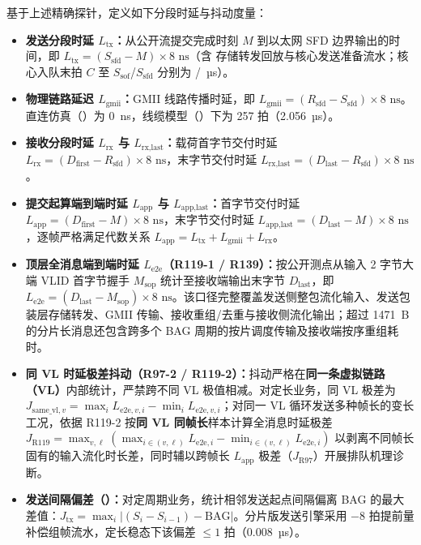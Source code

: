 基于上述精确探针，定义如下分段时延与抖动度量：
\begin{itemize}
  \item \textbf{发送分段时延 $L_\text{tx}$：}从公开流提交完成时刻 $M$ 到以太网 SFD 边界输出的时间，即 $L_\text{tx} = (S_\text{sfd} - M)\times 8\text{ ns}$（含  存储转发回放与核心发送准备流水；核心入队末拍 $C$ 至 $S_\text{sof}$/$S_\text{sfd}$ 分别为 \TtxSof/\TtxCore~µs）。
  \item \textbf{物理链路延迟 $L_\text{gmii}$：}GMII 线路传播时延，即 $L_\text{gmii} = (R_\text{sfd} - S_\text{sfd})\times 8\text{ ns}$。直连仿真（）为 0~ns，线缆模型（）下为 257 拍（2.056~µs）。
  \item \textbf{接收分段时延 $L_\text{rx}$ 与 $L_\text{rx,last}$：}载荷首字节交付时延 $L_\text{rx} = (D_\text{first} - R_\text{sfd})\times 8\text{ ns}$，末字节交付时延 $L_\text{rx,last} = (D_\text{last} - R_\text{sfd})\times 8\text{ ns}$。
  \item \textbf{提交起算端到端时延 $L_\text{app}$ 与 $L_\text{app,last}$：}首字节交付时延 $L_\text{app} = (D_\text{first} - M)\times 8\text{ ns}$，末字节交付时延 $L_\text{app,last} = (D_\text{last} - M)\times 8\text{ ns}$，逐帧严格满足代数关系 $L_\text{app} = L_\text{tx} + L_\text{gmii} + L_\text{rx}$。
  \item \textbf{顶层全消息端到端时延 $L_\text{e2e}$（R119-1 / R139）：}按公开测点从输入 2 字节大端 VLID 首字节握手 $M_\text{sop}$ 统计至接收端输出末字节 $D_\text{last}$，即 $L_\text{e2e} = (D_\text{last} - M_\text{sop})\times 8\text{ ns}$。该口径完整覆盖发送侧整包流化输入、发送包装层存储转发、GMII 传输、接收重组/去重与接收侧流化输出；超过 1471~B 的分片长消息还包含跨多个 BAG 周期的按片调度传输及接收端按序重组耗时。
  \item \textbf{同 VL 时延极差抖动（R97-2 / R119-2）：}抖动严格在\textbf{同一条虚拟链路（VL）}内部统计，严禁跨不同 VL 极值相减。对定长业务，同 VL 极差为 $J_{\text{same\_vl}, v} = \max_i L_{\text{e2e}, v, i} - \min_i L_{\text{e2e}, v, i}$；对同一 VL 循环发送多种帧长的变长工况，依据 R119-2 按\textbf{同 VL 同帧长}样本计算全消息时延极差 $J_{\text{R119}} = \max_{v, \ell}(\max_{i \in (v,\ell)} L_{\text{e2e}, i} - \min_{i \in (v,\ell)} L_{\text{e2e}, i})$ 以剥离不同帧长固有的输入流化时长差，同时辅以跨帧长 $L_\text{app}$ 极差（$J_\text{R97}$）开展排队机理诊断。
  \item \textbf{发送间隔偏差（）：}对定周期业务，统计相邻发送起点间隔偏离 BAG 的最大差值：$J_\text{tx} = \max_i |(S_{i} - S_{i-1}) - \text{BAG}|$。分片版发送引擎采用 $-8$ 拍提前量补偿组帧流水，定长稳态下该偏差 $\le 1$ 拍（0.008~µs）。
\end{itemize}

